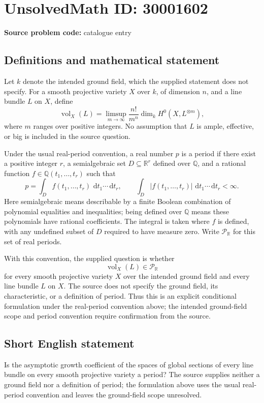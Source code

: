 \documentclass[11pt]{article}
\newcommand{\Q}{\mathbb{Q}}
\newcommand{\R}{\mathbb{R}}
\newcommand{\dd}{\,\mathrm{d}}
\begin{document}
\section*{UnsolvedMath ID: 30001602}
\textbf{Source problem code:} catalogue entry
\subsection{Definitions and mathematical statement}
Let \(k\) denote the intended ground field, which the supplied statement does not specify. For a smooth projective variety \(X\) over \(k\), of dimension \(n\), and a line bundle \(L\) on \(X\), define
\[
\operatorname{vol}_X(L)=\limsup_{m\to\infty}\frac{n!}{m^n}\dim_k H^0\!\left(X,L^{\otimes m}\right),
\]
where \(m\) ranges over positive integers. No assumption that \(L\) is ample, effective, or big is included in the source question.

Under the usual real-period convention, a real number \(p\) is a period if there exist a positive integer \(r\), a semialgebraic set \(D\subseteq\R^r\) defined over \(\Q\), and a rational function \(f\in\Q(t_1,\ldots,t_r)\) such that
\[
 p=\int_D f(t_1,\ldots,t_r)\,\dd t_1\cdots\dd t_r,
 \qquad
 \int_D |f(t_1,\ldots,t_r)|\,\dd t_1\cdots\dd t_r<\infty.
\]
Here semialgebraic means describable by a finite Boolean combination of polynomial equalities and inequalities; being defined over \(\Q\) means these polynomials have rational coefficients. The integral is taken where \(f\) is defined, with any undefined subset of \(D\) required to have measure zero. Write \(\mathcal P_{\R}\) for this set of real periods.

With this convention, the supplied question is whether
\[
\operatorname{vol}_X(L)\in\mathcal P_{\R}
\]
for every smooth projective variety \(X\) over the intended ground field and every line bundle \(L\) on \(X\). The source does not specify the ground field, its characteristic, or a definition of period. Thus this is an explicit conditional formulation under the real-period convention above; the intended ground-field scope and period convention require confirmation from the source.
\subsection{Short English statement}
Is the asymptotic growth coefficient of the spaces of global sections of every line bundle on every smooth projective variety a period? The source supplies neither a ground field nor a definition of period; the formulation above uses the usual real-period convention and leaves the ground-field scope unresolved.
\end{document}
